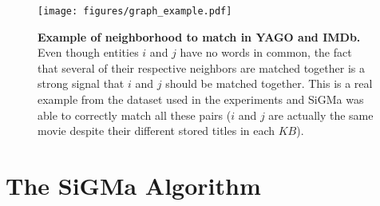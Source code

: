 \documentclass{sig-alternate}
\newcommand{\ts}[1]{\textsf{#1}}
\newcommand{\KB}{K\!B}
\begin{document}
%
%
%
%
\begin{figure}
	\begin{center}
		\texttt{[image: figures/graph\_example.pdf]}
	\end{center}
    \vspace*{-6mm}
	\caption{\textbf{Example of neighborhood to match in \ts{YAGO} and \ts{IMDb}.} \textnormal{Even though entities $i$ and $j$ have no words in common, the fact that several of their respective neighbors are matched together is a strong signal that $i$ and $j$ should be matched together. This is a real example from the dataset used in the experiments and \ts{SiGMa} was able to correctly match all these pairs ($i$ and $j$ are actually the same movie despite their different stored titles in each $\KB$).}} \label{fig:example}
\end{figure}

\section{The SiGMa Algorithm} \label{sec:algorithm}
\end{document}
